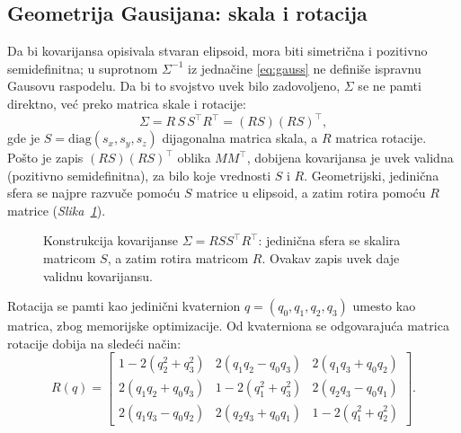 \documentclass[12pt]{article}
\begin{document}
   \newpage
   \subsection{Geometrija Gausijana: skala i rotacija}

   Da bi kovarijansa opisivala stvaran elipsoid, mora biti simetrična i pozitivno
   semidefinitna; u suprotnom $\Sigma^{-1}$ iz jednačine \eqref{eq:gauss} ne definiše
   ispravnu Gausovu raspodelu. Da bi to svojstvo uvek bilo zadovoljeno, $\Sigma$ se ne pamti direktno,
   već preko matrica skale i rotacije:
   \begin{equation}\label{eq:cov}
      \Sigma = R\,S\,S^\top R^\top = (RS)(RS)^\top,
   \end{equation}
   gde je $S = \mathrm{diag}(s_x, s_y, s_z)$ dijagonalna matrica skala, a $R$
   matrica rotacije. Pošto je zapis $(RS)(RS)^\top$ oblika $MM^\top$, dobijena
   kovarijansa je uvek validna (pozitivno semidefinitna), za bilo koje vrednosti
   $S$ i $R$. Geometrijski, jedinična sfera se najpre razvuče pomoću $S$ matrice u elipsoid, 
   a zatim rotira pomoću $R$ matrice (\textit{Slika~\ref{fig:cov}}).

   \begin{figure}[H]
      \centering
      \caption{Konstrukcija kovarijanse $\Sigma = R S S^\top R^\top$: jedinična
      sfera se skalira matricom $S$, a zatim rotira
      matricom $R$. Ovakav zapis uvek daje validnu kovarijansu.}
      \label{fig:cov}
   \end{figure}

   Rotacija se pamti kao jedinični kvaternion $q = (q_0, q_1, q_2, q_3)$ umesto kao
   matrica, zbog memorijske optimizacije. Od kvaterniona se odgovarajuća matrica rotacije dobija na sledeći način:
   \begin{equation}\label{eq:quat}
      R(q) = \begin{bmatrix}
         1 - 2(q_2^2 + q_3^2) & 2(q_1 q_2 - q_0 q_3) & 2(q_1 q_3 + q_0 q_2) \\
         2(q_1 q_2 + q_0 q_3) & 1 - 2(q_1^2 + q_3^2) & 2(q_2 q_3 - q_0 q_1) \\
         2(q_1 q_3 - q_0 q_2) & 2(q_2 q_3 + q_0 q_1) & 1 - 2(q_1^2 + q_2^2)
      \end{bmatrix}.
   \end{equation}
\end{document}
